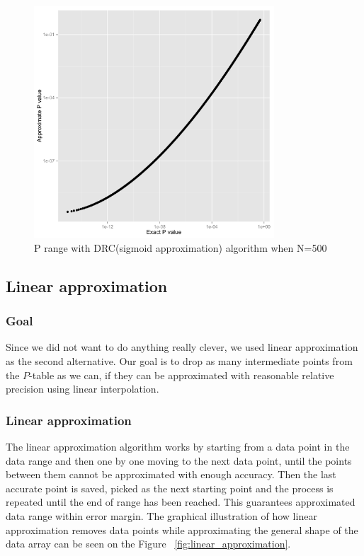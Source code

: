 \documentclass[12pt]{article}
\begin{document}
{\begin{figure}[H]
  \centering
  \includegraphics[width=0.8\textwidth]{PvsP50}
  \caption{P range with DRC(sigmoid approximation) algorithm when N=500}
  \label{fig:PdivPapproxDrcWhenN500}
\end{figure}

\subsection{Linear approximation}

\subsubsection{Goal}

Since we did not want to do anything really clever, we used linear approximation as the second alternative. Our goal is to drop as many intermediate points from the $P$-table as we can, if they can be approximated with reasonable relative precision using linear interpolation.

\subsubsection{Linear approximation}
The linear approximation algorithm works by starting from a data point in the data range and then one by one moving to the next data point, until the points between them cannot be approximated with enough accuracy. Then the last accurate point is saved, picked as the next starting point and the process is repeated until the end of range has been reached. This guarantees approximated data range within error margin. The graphical illustration of how linear approximation removes data points while approximating the general shape of the data array can be seen on the Figure ~\ref{fig:linear_approximation}.

}
\end{document}
